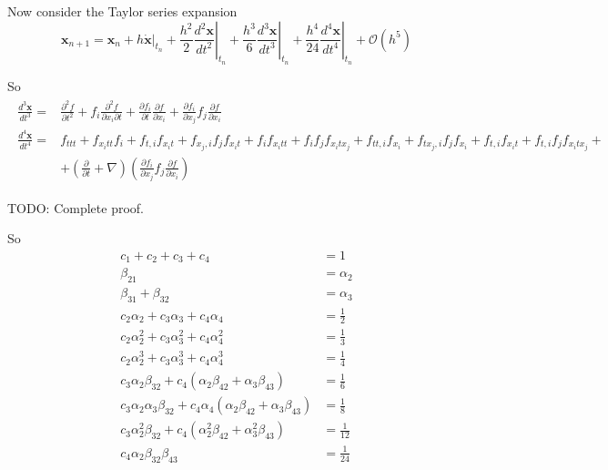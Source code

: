 \documentclass[10pt]{amsart}
\begin{document}
\begin{multicols*}{2}
Now consider the Taylor series expansion
\[
\mathbf{x}_{n+1} = \mathbf{x}_n + h \left. \dot{ \mathbf{x}} \right|_{t_n} + \frac{h^2}{2} \left. \frac{d^2 \mathbf{x}}{ dt^2} \right|_{t_n} + \frac{h^3}{6} \left. \frac{d^3 \mathbf{x}}{ dt^3} \right|_{t_n} + \frac{h^4}{24} \left. \frac{d^4 \mathbf{x}}{ dt^4} \right|_{t_n} + \mathcal{O}(h^5)
\]

So
\[
\begin{gathered}
\begin{aligned}
\frac{d^3 \mathbf{x}}{dt^3} = & \frac{\partial^2 f}{\partial t^2} + f_i \frac{ \partial^2 f}{ \partial x_i \partial t} + \frac{ \partial f_i}{\partial t} \frac{ \partial f}{\partial x_i} + \frac{\partial f_i}{\partial x_j} f_j \frac{\partial f}{\partial x_i}  \\
\frac{d^4 \mathbf{x}}{dt^4} = & f_{ttt} + f_{x_i tt}f_i + f_{t,i} f_{x_i t} + f_{x_j, i} f_j f_{x_i t} + f_i f_{x_i tt} + f_i f_j f_{x_i t  x_j} + f_{tt, i} f_{x_i} + f_{tx_j, i} f_j f_{x_i} + f_{t,i} f_{x_i t} + f_{t,i} f_j f_{x_i t x_j} + \\
& + \left(\frac{ \partial}{\partial t} + \nabla \right)\left( \frac{ \partial f_i}{\partial x_j} f_j \frac{ \partial f}{\partial x_i} \right)
\end{aligned}
\end{gathered}
\]

TODO: Complete proof.

So
\begin{equation}
\begin{aligned}
	c_1 + c_2 + c_3 + c_4 & = 1 \\
	\beta_{21} & = \alpha_2 \\
	\beta_{31} + \beta_{32} & = \alpha_3 \\
	c_2 \alpha_2 + c_3 \alpha_3 + c_4 \alpha_4 & = \frac{1}{2} \\
	c_2 \alpha_2^2 + c_3 \alpha_3^2 + c_4 \alpha_4^2 & = \frac{1}{3} \\
	c_2 \alpha_2^3 + c_3 \alpha_3^3 + c_4 \alpha_4^3 & = \frac{1}{4} \\
	c_3 \alpha_2 \beta_{32} + c_4 (\alpha_2 \beta_{42} + \alpha_3 \beta_{43}) & = \frac{1}{6} \\
	c_3 \alpha_2 \alpha_3 \beta_{32} + c_4 \alpha_4 (\alpha_2 \beta_{42} + \alpha_3 \beta_{43}) & = \frac{1}{8} \\
	c_3 \alpha_2^2  \beta_{32} + c_4  (\alpha_2^2 \beta_{42} + \alpha_3^2 \beta_{43}) & = \frac{1}{12} \\
	c_4 \alpha_2 \beta_{32} \beta_{43} & = \frac{1}{24}
\end{aligned}
\end{equation}


\end{multicols*}
\end{document}
